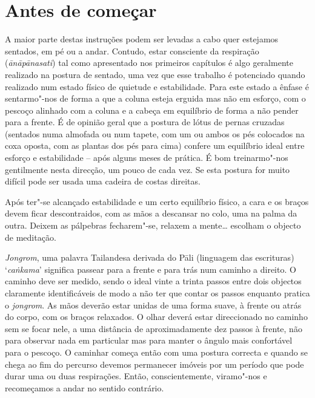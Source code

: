 \chapter{Antes de começar}

A maior parte destas instruções podem ser levadas a cabo quer estejamos
sentados, em pé ou a andar. Contudo, estar consciente da respiração
(\emph{ānāpānasati}) tal como apresentado nos primeiros capítulos é algo
geralmente realizado na postura de sentado, uma vez que esse trabalho é
potenciado quando realizado num estado físico de quietude e
estabilidade. Para este estado a ênfase é sentarmo"-nos de forma a que a
coluna esteja erguida mas não em esforço, com o pescoço alinhado com a
coluna e a cabeça em equilíbrio de forma a não pender para a frente. É
de opinião geral que a postura de lótus de pernas cruzadas (sentados
numa almofada ou num tapete, com um ou ambos os pés colocados na coxa
oposta, com as plantas dos pés para cima) confere um equilíbrio ideal
entre esforço e estabilidade -- após alguns meses de prática. É bom
treinarmo"-nos gentilmente nesta direcção, um pouco de cada vez. Se esta
postura for muito difícil pode ser usada uma cadeira de costas direitas.

Após ter"-se alcançado estabilidade e um certo equilíbrio físico, a cara
e os braços devem ficar descontraidos, com as mãos a descansar no colo,
uma na palma da outra. Deixem as pálpebras fecharem"-se, relaxem a
mente\ldots{} escolham o objecto de meditação.

\emph{Jongrom}, uma palavra Tailandesa derivada do Pāli (linguagem das
escrituras) `\emph{caṅkama}' significa passear para a frente e para trás
num caminho a direito. O caminho deve ser medido, sendo o ideal vinte a
trinta passos entre dois objectos claramente
identificáveis de modo a não ter que contar os passos enquanto
pratica o \emph{jongrom}. As mãos deverão estar unidas de uma forma
suave, à frente ou atrás do corpo, com os braços relaxados. O olhar
deverá estar direccionado no caminho sem se focar nele, a uma distância
de aproximadamente dez passos à frente, não para observar nada em
particular mas para manter o ângulo mais confortável para o pescoço. O
caminhar começa então com uma postura correcta e quando se chega ao fim
do percurso devemos permanecer imóveis por um período que pode durar uma
ou duas respirações. Então, conscientemente, viramo"-nos e recomeçamos a
andar no sentido contrário.

